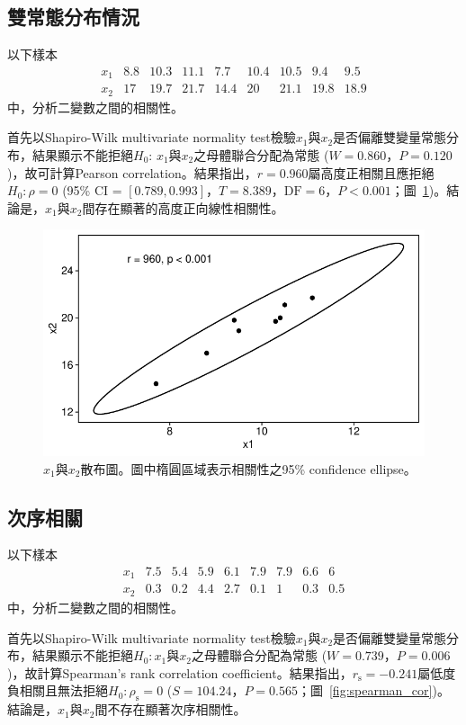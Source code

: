 \documentclass[12pt]{article}
\renewcommand{\figurename}{圖}
\newcommand*{\figref}[1]{\figurename~\ref{#1}}
\begin{document}
\subsection{雙常態分布情況}
以下樣本
\[
\begin{matrix}
x_1 & 8.8 & 10.3 & 11.1 & 7.7 & 10.4 & 10.5 & 9.4 & 9.5\\
x_2 & 17 & 19.7 & 21.7 & 14.4 & 20 & 21.1 & 19.8 & 18.9
\end{matrix}
\]
中，分析二變數之間的相關性。

首先以Shapiro-Wilk multivariate normality test檢驗$x_1$與$x_2$是否偏離雙變量常態分布，結果顯示不能拒絕$H_0$: $x_1$與$x_2$之母體聯合分配為常態 ($W = 0.860$，$P = 0.120$)，故可計算Pearson correlation。結果指出，$r = 0.960$屬高度正相關且應拒絕$H_0:\rho=0$ (95\% CI = $\left[ 0.789, 0.993\right]$，$T = 8.389$，$\text{DF} = 6$，$P < 0.001$；\figref{fig:simple_cor})。結論是，$x_1$與$x_2$間存在顯著的高度正向線性相關性。

\begin{figure}[htbp]
	\centering
	\includegraphics[]{simple_cor.pdf}
	\caption{$x_1$與$x_2$散布圖。圖中楕圓區域表示相關性之95\% confidence ellipse。}
	\label{fig:simple_cor}
\end{figure}

\subsection{次序相關}
以下樣本
\[
\begin{matrix}
x_1 & 7.5 & 5.4 & 5.9 & 6.1 & 7.9 & 7.9 & 6.6 & 6\\
x_2 & 0.3 & 0.2 & 4.4 & 2.7 & 0.1 & 1 & 0.3 & 0.5
\end{matrix}
\]
中，分析二變數之間的相關性。

首先以Shapiro-Wilk multivariate normality test檢驗$x_1$與$x_2$是否偏離雙變量常態分布，結果顯示不能拒絕$H_0: x_1與x_2之母體聯合分配為常態$ ($W = 0.739$，$P = 0.006$)，故計算Spearman's rank correlation coefficient。結果指出，$r_\mathrm{s} = -0.241$屬低度負相關且無法拒絕$H_0:\rho_\mathrm{s}=0$ ($S = 104.24$，$P=0.565$；\figref{fig:spearman_cor})。結論是，$x_1$與$x_2$間不存在顯著次序相關性。
\end{document}
